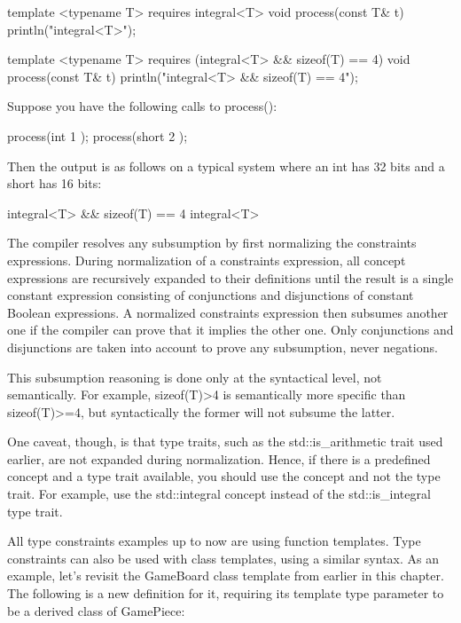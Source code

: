 \begin{cpp}
template <typename T> requires integral<T>
void process(const T& t) { println("integral<T>"); }

template <typename T> requires (integral<T> && sizeof(T) == 4)
void process(const T& t) { println("integral<T> && sizeof(T) == 4"); }
\end{cpp}

Suppose you have the following calls to process():

\begin{cpp}
process(int { 1 });
process(short { 2 });
\end{cpp}

Then the output is as follows on a typical system where an int has 32 bits and a short has 16 bits:

\begin{shell}
integral<T> && sizeof(T) == 4
integral<T>
\end{shell}

The compiler resolves any subsumption by first normalizing the constraints expressions. During normalization of a constraints expression, all concept expressions are recursively expanded to their definitions until the result is a single constant expression consisting of conjunctions and disjunctions of constant Boolean expressions. A normalized constraints expression then subsumes another one if the compiler can prove that it implies the other one. Only conjunctions and disjunctions are taken into account to prove any subsumption, never negations.

This subsumption reasoning is done only at the syntactical level, not semantically. For example, sizeof(T)>4 is semantically more specific than sizeof(T)>=4, but syntactically the former will not subsume the latter.

One caveat, though, is that type traits, such as the std::is\_arithmetic trait used earlier, are not expanded during normalization. Hence, if there is a predefined concept and a type trait available, you should use the concept and not the type trait. For example, use the std::integral concept instead of the std::is\_integral type trait.


All type constraints examples up to now are using function templates. Type constraints can also be used with class templates, using a similar syntax. As an example, let’s revisit the GameBoard class template from earlier in this chapter. The following is a new definition for it, requiring its template type parameter to be a derived class of GamePiece:

